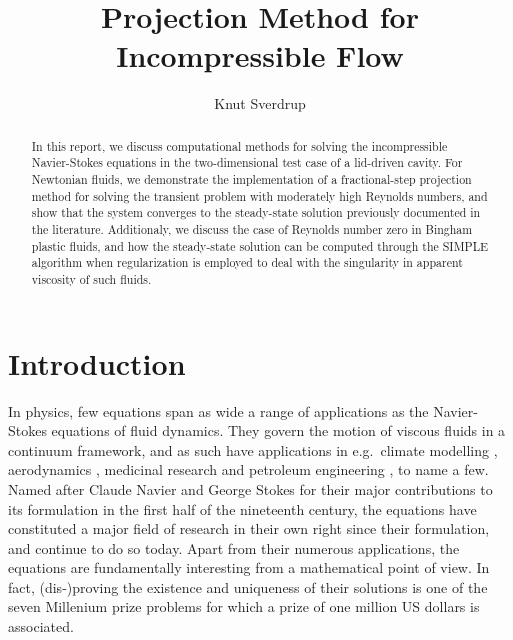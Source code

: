 \documentclass[final,3p,twocolumn]{elsarticle}
\begin{document}
\begin{frontmatter}

\title{Projection Method for Incompressible Flow}

\author{Knut Sverdrup}

\begin{abstract}
    In this report, we discuss computational methods for solving the
    incompressible Navier-Stokes equations in the two-dimensional test case of
    a lid-driven cavity. For Newtonian fluids, we demonstrate the
    implementation of a fractional-step projection method for solving the
    transient problem with moderately high Reynolds numbers, and show that the system
    converges to the steady-state solution previously documented in the
    literature. Additionaly, we discuss the case of Reynolds number zero in
    Bingham plastic fluids, and how the steady-state solution can be computed
    through the SIMPLE algorithm when regularization is employed to deal with
    the singularity in apparent viscosity of such fluids. 
\end{abstract}

\end{frontmatter}

\section{Introduction}
\label{sec:introduction}

In physics, few equations span as wide a range of applications as the
Navier-Stokes equations of fluid dynamics. They govern the motion of viscous
fluids in a continuum framework, and as such have applications in e.g.\ climate
modelling \cite{marshall1997finite, giraldo2008study}, aerodynamics
\cite{rai1987navier, thomas1990navier, jameson1998optimum}, medicinal research
\cite{peskin1977numerical, mihaescu2008large} and petroleum engineering
\cite{deiber1979flow, vinay2006numerical, cardenas2007navier, boyer2010cahn},
to name a few. Named after Claude Navier and George Stokes for their major
contributions \cite{navier1822memoire, stokes1845theories} to its formulation
in the first half of the nineteenth century, the equations have constituted a
major field of research in their own right since their formulation, and
continue to do so today. Apart from their numerous applications, the equations
are fundamentally interesting from a mathematical point of view. In fact,
(dis-)proving the existence and uniqueness of their solutions is one of the
seven Millenium prize problems \cite{fefferman2006existence} for which a prize
of one million US dollars is associated. 
\end{document}
